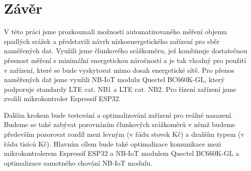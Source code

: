 \chapter*{Závěr}
{}

\par V této práci jsme prozkoumali možnosti automatizovaného měření objemu spadlých srážek a představili návrh nízkoenergetického zařízení pro sběr naměřených dat. Využili jsme člunkového srážkoměru, jež kombinuje dostatečnou přesnost měření s minimální energetickou náročností a je tak vhodný pro použití v zařízení, které se bude vyskytovat mimo dosah energetické sítě. Pro přenos naměřených dat jsme využili NB-IoT modulu Quectel BC660K-GL, který podporuje standardy LTE cat. NB1 a LTE cat. NB2. Pro řízení zařízení jsme zvolili mikrokontroler Espressif ESP32.
\par Dalším krokem bude testování a optimalizování zařízení pro reálné nasazení. Budeme se také zabývat porovnáním člunkových srážkoměrů v němž budeme především pozorovat rozdíl mezi levným (v řádu stovek Kč) a dražším typem (v řádu tisíců Kč). Hlavním cílem bude také optimalizace komunikace mezi mikrokontrolerem Espressif ESP32 a NB-IoT modulem Quectel BC660K-GL a optimalizace samotného chování NB-IoT modulu.
